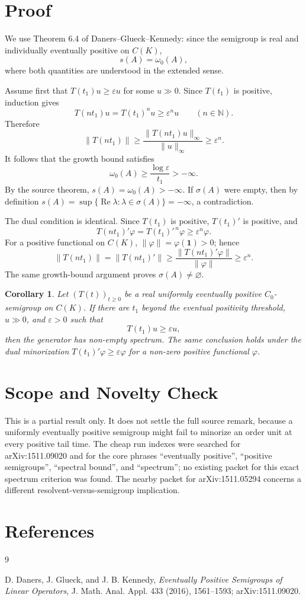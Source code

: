\documentclass[11pt]{article}
\newtheorem{corollary}{Corollary}
\newcommand{\eps}{\varepsilon}
\newcommand{\spb}{s}
\newcommand{\gbd}{\omega_0}
\newcommand{\sig}{\sigma}
\begin{document}
\section*{Proof}

We use Theorem 6.4 of Daners--Glueck--Kennedy: since the semigroup is real and
individually eventually positive on \(C(K)\),
\[
  \spb(A)=\gbd(A),
\]
where both quantities are understood in the extended sense.

Assume first that \(T(t_1)u\ge\eps u\) for some \(u\gg0\).  Since \(T(t_1)\)
is positive, induction gives
\[
  T(nt_1)u=T(t_1)^n u\ge \eps^n u
  \qquad(n\in\mathbb N).
\]
Therefore
\[
  \|T(nt_1)\|
  \ge \frac{\|T(nt_1)u\|_\infty}{\|u\|_\infty}
  \ge \eps^n .
\]
It follows that the growth bound satisfies
\[
  \gbd(A)
  \ge \frac{\log\eps}{t_1}>-\infty .
\]
By the source theorem, \(\spb(A)=\gbd(A)>-\infty\).  If \(\sig(A)\) were
empty, then by definition \(\spb(A)=\sup\{\operatorname{Re}\lambda:
\lambda\in\sig(A)\}=-\infty\), a contradiction.

The dual condition is identical.  Since \(T(t_1)\) is positive,
\(T(t_1)'\) is positive, and
\[
  T(nt_1)'\varphi=T(t_1)'^{\,n}\varphi\ge \eps^n\varphi .
\]
For a positive functional on \(C(K)\), \(\|\varphi\|=\varphi(\mathbf 1)>0\);
hence
\[
  \|T(nt_1)\|=\|T(nt_1)'\|
  \ge \frac{\|T(nt_1)'\varphi\|}{\|\varphi\|}
  \ge \eps^n.
\]
The same growth-bound argument proves \(\sig(A)\ne\varnothing\).

\begin{corollary}
Let \((T(t))_{t\ge0}\) be a real uniformly eventually positive
\(C_0\)-semigroup on \(C(K)\).  If there are \(t_1\) beyond the eventual
positivity threshold, \(u\gg0\), and \(\eps>0\) such that
\[
  T(t_1)u\ge\eps u,
\]
then the generator has non-empty spectrum.  The same conclusion holds under
the dual minorization \(T(t_1)'\varphi\ge\eps\varphi\) for a non-zero positive
functional \(\varphi\).
\end{corollary}

\section*{Scope and Novelty Check}

This is a partial result only.  It does not settle the full source remark,
because a uniformly eventually positive semigroup might fail to minorize an
order unit at every positive tail time.  The cheap run indexes were searched
for arXiv:1511.09020 and for the core phrases ``eventually positive'',
``positive semigroups'', ``spectral bound'', and ``spectrum''; no existing
packet for this exact spectrum criterion was found.  The nearby packet for
arXiv:1511.05294 concerns a different resolvent-versus-semigroup implication.

\section*{References}

\begin{thebibliography}{9}

D. Daners, J. Glueck, and J. B. Kennedy,
\emph{Eventually Positive Semigroups of Linear Operators},
J. Math. Anal. Appl. 433 (2016), 1561--1593; arXiv:1511.09020.

\end{thebibliography}
\end{document}
